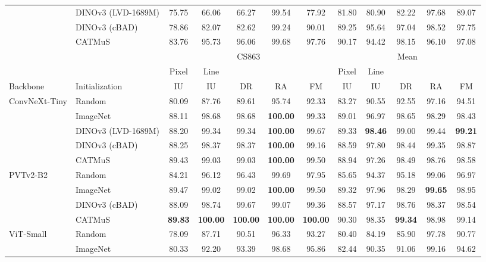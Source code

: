 \begin{table}[htbp]
\begin{tabular*}{\textwidth}{@{\extracolsep{\fill}}ll*{10}{c}@{}}
         & DINOv3 (LVD-1689M) & 75.75 & 66.06 & 66.27 & 99.54 & 77.92 & 81.80 & 80.90 & 82.22 & 97.68 & 89.07 \\
         & DINOv3 (cBAD) & 78.86 & 82.07 & 82.62 & 99.24 & 90.01 & 89.25 & 95.64 & 97.04 & 98.52 & 97.75 \\
         & CATMuS & 83.76 & 95.73 & 96.06 & 99.68 & 97.76 & 90.17 & 94.42 & 98.15 & 96.10 & 97.08 \\
        \midrule
        & & \multicolumn{5}{c}{CS863} & \multicolumn{5}{c}{Mean} \\
        \cmidrule(lr){3-7}\cmidrule(l){8-12}
        & & Pixel & Line & & & & Pixel & Line & & & \\
        Backbone & Initialization & IU & IU & DR & RA & FM & IU & IU & DR & RA & FM \\
        \midrule
        ConvNeXt-Tiny & Random & 80.09 & 87.76 & 89.61 & 95.74 & 92.33 & 83.27 & 90.55 & 92.55 & 97.16 & 94.51 \\
         & ImageNet & 88.11 & 98.68 & 98.68 & \textbf{100.00} & 99.33 & 89.01 & 96.97 & 98.65 & 98.29 & 98.43 \\
         & DINOv3 (LVD-1689M) & 88.20 & 99.34 & 99.34 & \textbf{100.00} & 99.67 & 89.33 & \textbf{98.46} & 99.00 & 99.44 & \textbf{99.21} \\
         & DINOv3 (cBAD) & 88.25 & 98.37 & 98.37 & \textbf{100.00} & 99.16 & 88.59 & 97.80 & 98.44 & 99.35 & 98.87 \\
         & CATMuS & 89.43 & 99.03 & 99.03 & \textbf{100.00} & 99.50 & 88.94 & 97.26 & 98.49 & 98.76 & 98.58 \\
        \addlinespace[1pt]
        PVTv2-B2 & Random & 84.21 & 96.12 & 96.43 & 99.69 & 97.95 & 85.65 & 94.37 & 95.18 & 99.06 & 96.97 \\
         & ImageNet & 89.47 & 99.02 & 99.02 & \textbf{100.00} & 99.50 & 89.32 & 97.96 & 98.29 & \textbf{99.65} & 98.95 \\
         & DINOv3 (cBAD) & 88.09 & 98.74 & 99.67 & 99.07 & 99.36 & 88.57 & 97.17 & 98.76 & 98.37 & 98.54 \\
         & CATMuS & \textbf{89.83} & \textbf{100.00} & \textbf{100.00} & \textbf{100.00} & \textbf{100.00} & 90.30 & 98.35 & \textbf{99.34} & 98.98 & 99.14 \\
        \addlinespace[1pt]
        ViT-Small & Random & 78.09 & 87.71 & 90.51 & 96.33 & 93.27 & 80.40 & 84.19 & 85.90 & 97.78 & 90.77 \\
         & ImageNet & 80.33 & 92.20 & 93.39 & 98.68 & 95.86 & 82.44 & 90.35 & 91.06 & 99.16 & 94.62 \\

\end{tabular*}
\end{table}
